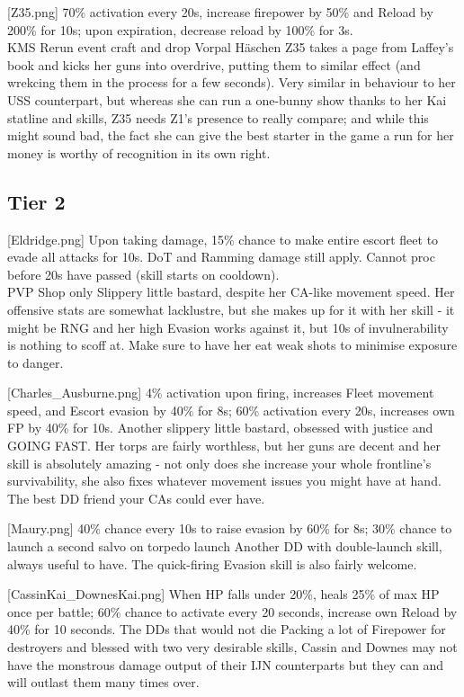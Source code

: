 [Z35.png]
{70\% activation every 20s, increase firepower by 50\% and Reload by 200\% for 10s; upon expiration, decrease reload by 100\% for 3s.\\
KMS Rerun event craft and drop}
{Vorpal Häschen}
{Z35 takes a page from Laffey's book and kicks her guns into overdrive, putting them to similar effect (and wrekcing them in the process for a few seconds). Very similar in behaviour to her USS counterpart, but whereas she can run a one-bunny show thanks to her Kai statline and skills, Z35 needs Z1's presence to really compare; and while this might sound bad, the fact she can give the best starter in the game a run for her money is worthy of recognition in its own right.}


\newpage
\subsection{Tier 2}
[Eldridge.png]
{Upon taking damage, 15\% chance to make entire escort fleet to evade all attacks for 10s. DoT and Ramming damage still apply. Cannot proc before 20s have passed (skill starts on cooldown).\\
PVP Shop only}
{}
{Slippery little bastard, despite her CA-like movement speed. Her offensive stats are somewhat lacklustre, but she makes up for it with her skill - it might be RNG and her high Evasion works against it, but 10s of invulnerability is nothing to scoff at. Make sure to have her eat weak shots to minimise exposure to danger.}
 
[Charles_Ausburne.png]
{4\% activation upon firing, increases Fleet movement speed, and Escort evasion by 40\% for 8s; 60\% activation every 20s, increases own FP by 40\% for 10s.}
{}
{Another slippery little bastard, obsessed with justice and GOING FAST. Her torps are fairly worthless, but her guns are decent and her skill is absolutely amazing - not only does she increase your whole frontline's survivability, she also fixes whatever movement issues you might have at hand. The best DD friend your CAs could ever have.}
 
[Maury.png]
{40\% chance every 10s to raise evasion by 60\% for 8s; 30\% chance to launch a second salvo on torpedo launch}
{}
{Another DD with double-launch skill, always useful to have. The quick-firing Evasion skill is also fairly welcome.}
 
[CassinKai_DownesKai.png]
{When HP falls under 20\%, heals 25\% of max HP once per battle; 60\% chance to activate every 20 seconds, increase own Reload by 40\% for 10 seconds.}
{The DDs that would not die}
{Packing a lot of Firepower for destroyers and blessed with two very desirable skills, Cassin and Downes may not have the monstrous damage output of their IJN counterparts but they can and will outlast them many times over.}
 
